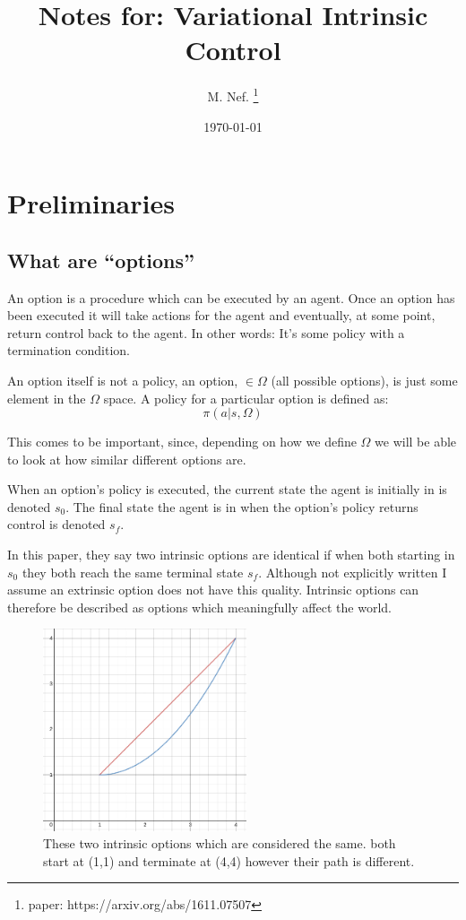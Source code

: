 \documentclass{article}
\title{Notes for: Variational Intrinsic Control}
\author{M. Nef. \thanks{paper: https://arxiv.org/abs/1611.07507}}
\date{\today}
\begin{document}
\maketitle

\section{Preliminaries}

\subsection{What are ``options''}

An option is a procedure which can be executed by an agent. Once an option has been executed it will take actions for the agent and eventually, at some point, return control back to the agent. In other words: It's some policy with a termination condition.


An option itself is not a policy, an option, \(\in \Omega\) (all possible options), is just some element in the \(\Omega\) space.
A policy for a particular option is defined as:
\begin{equation}
  \label{eq:1}
  \pi(a | s, \Omega)
\end{equation}

This comes to be important, since, depending on how we define \(\Omega\) we will be able to look at how similar different options are.


When an option's policy is executed, the current state the agent is initially in is denoted \(s_{0}\). The final state the agent is in when the option's policy returns control is denoted \(s_{f}\).


In this paper, they say two intrinsic options are identical if when both starting in \(s_{0}\) they both reach the same terminal state \(s_{f}\). Although not explicitly written I assume an extrinsic option does not have this quality. Intrinsic options can therefore be described as options which meaningfully affect the world.


\begin{figure}[!ht]
\begin{center}
  \includegraphics[width=60mm]{images/same_options.png}
  \caption{These two intrinsic options which are considered the same. both start at (1,1) and terminate at (4,4) however their path is different.}
\end{center}
\end{figure}
\end{document}
